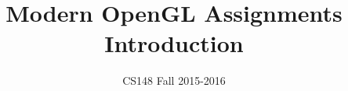 \documentclass{article}
\begin{document}
\title{Modern OpenGL Assignments Introduction}
\author{CS148 Fall 2015-2016}
\date{}
\maketitle
\end{document}
